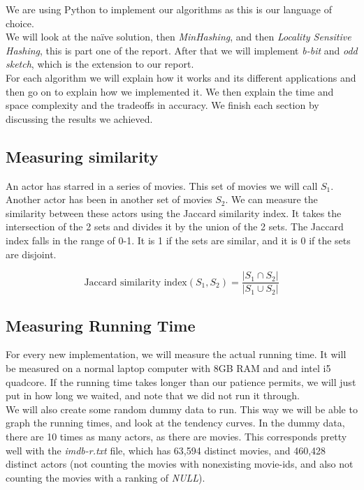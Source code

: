 \documentclass[a4paper,11pt]{article}
\begin{document}
We are using Python to implement our algorithms as this is our language of choice. \\

We will look at the naïve solution, then \emph{MinHashing}, and then \emph{Locality Sensitive Hashing}, this is part one of the report. After that we will implement \emph{b-bit} and \emph{odd sketch}, which is the extension to our report.\\

For each algorithm we will explain how it works and its different applications and then go on to explain how we implemented it. We then explain the time and space complexity and the tradeoffs in accuracy. We finish each section by discussing the results we achieved.\\


\subsection{Measuring similarity}
An actor has starred in a series of movies. This set of movies we will call $S_1$. Another actor has been in another set of movies $S_2$. We can measure the similarity between these actors using the Jaccard similarity index. It takes the intersection of the 2 sets and divides it by the union of the 2 sets. The Jaccard index falls in the range of 0-1. It is 1 if the sets are similar, and it is 0 if the sets are disjoint.

\begin{equation}
\text{Jaccard similarity index} (S_1, S_2) = \frac{|S_1 \cap S_2|}{|S_1 \cup S_2|}
\end{equation}



\subsection{Measuring Running Time}

For every new implementation, we will measure the actual running time. It will be measured on a normal laptop computer with 8GB RAM and and intel i5 quadcore. If the running time takes longer than our patience permits, we will just put in how long we waited, and note that we did not run it through.\\

We will also create some random dummy data to run. This way we will be able to graph the running times, and look at the tendency curves. In the dummy data, there are 10 times as many actors, as there are movies. This corresponds pretty well with the \emph{imdb-r.txt} file, which has 63,594 distinct movies, and 460,428 distinct actors (not counting the movies with nonexisting movie-ids, and also not counting the movies with a ranking of \emph{NULL}).\\
\end{document}
